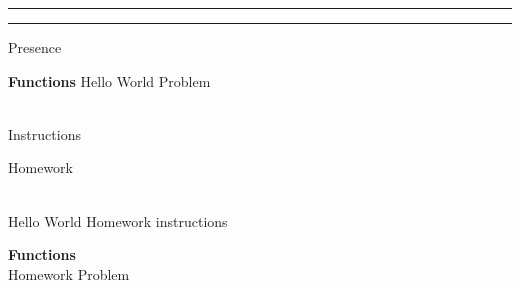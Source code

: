\documentclass[english,ngerman]{article}
\title[\sExam]{\Exam}
\date{SS 2021}
\begin{document}
\maketitle              %
\begin{center}
  \hrule  \vspace{0.2cm}
  \webtitle%
  \vspace{0.2cm} \hrule
\end{center}
\begin{verB}
\end{verB}

\begin{exam}[Presence]{Presence}
  \begin{problem}{\bf Functions}
    Hello World Problem
  \end{problem}
  \begin{instructions}\\%
    Instructions
  \end{instructions}
\end{exam}

\newpage
\begin{exam}[Homework]{Homework}
  \begin{instructions}[\bf Homework]\\
    Hello World Homework instructions
  \end{instructions}

  \begin{problem}[3]{\bf Functions} \\
    Homework Problem
  \end{problem}
\end{exam}
\end{document}
